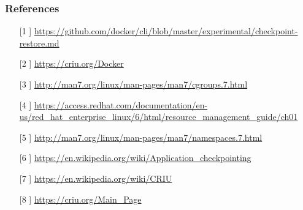 \documentclass[9pt,    %
    english,            %
    xcolor=table,       %
    envcountsect,        %
    aspectratio=169     %
]{beamer}
\begin{document}
\begin{frame}
    \frametitle{References}

    \tiny

    \begin{enumerate}
        \item[[1]] \url{https://github.com/docker/cli/blob/master/experimental/checkpoint-restore.md}
        \item[[2]] \url{https://criu.org/Docker}
        \item[[3]] \url{http://man7.org/linux/man-pages/man7/cgroups.7.html}
        \item[[4]] \url{https://access.redhat.com/documentation/en-us/red_hat_enterprise_linux/6/html/resource_management_guide/ch01}
        \item[[5]] \url{http://man7.org/linux/man-pages/man7/namespaces.7.html}
        \item[[6]] \url{https://en.wikipedia.org/wiki/Application_checkpointing}
        \item[[7]] \url{https://en.wikipedia.org/wiki/CRIU}
        \item[[8]] \url{https://criu.org/Main_Page}
    \end{enumerate}

\end{frame}
\end{document}
